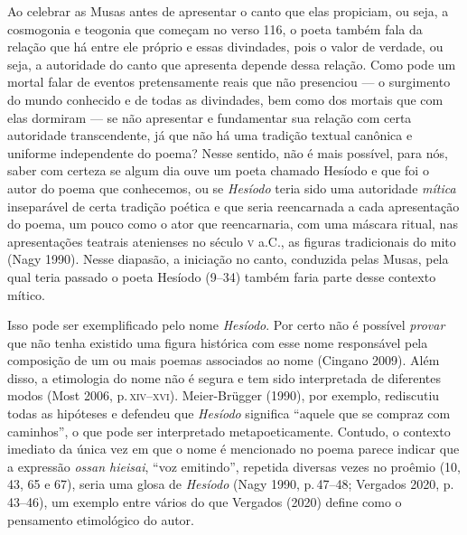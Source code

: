 Ao celebrar as Musas antes de apresentar o canto que elas propiciam, ou
seja, a cosmogonia e teogonia que começam no verso 116, o poeta também
fala da relação que há entre ele próprio e essas divindades, pois o
valor de verdade, ou seja, a autoridade do canto que apresenta depende
dessa relação. Como pode um mortal falar de eventos pretensamente reais
que não presenciou --- o surgimento do mundo conhecido e de todas as
divindades, bem como dos mortais que com elas dormiram --- se não
apresentar e fundamentar sua relação com certa autoridade transcendente,
já que não há uma tradição textual canônica e uniforme independente do
poema? Nesse sentido, não é mais possível, para nós, saber com certeza
se algum dia ouve um poeta chamado Hesíodo e que foi o autor do poema
que conhecemos, ou se \textit{Hesíodo} teria sido uma autoridade
\textit{mítica} inseparável de certa tradição poética e que seria
reencarnada a cada apresentação do poema, um pouco como o ator que
reencarnaria, com uma máscara ritual, nas apresentações teatrais
atenienses no século \textsc{v} a.C., as figuras tradicionais do mito (Nagy
1990). Nesse diapasão, a iniciação no canto, conduzida pelas Musas, pela
qual teria passado o poeta Hesíodo (9--34) também faria parte desse
contexto mítico.

Isso pode ser exemplificado pelo nome \textit{Hesíodo}. Por certo não é
possível \textit{provar} que não tenha existido uma figura histórica com
esse nome responsável pela composição de um ou mais poemas associados ao
nome (Cingano 2009). Além disso, a etimologia do nome não é segura e tem
sido interpretada de diferentes modos (Most 2006, p.\,\textsc{xiv--xvi}).
Meier-Brügger (1990), por exemplo, rediscutiu todas as hipóteses e
defendeu que \textit{Hesíodo} significa ``aquele que se compraz com
caminhos'', o que pode ser interpretado metapoeticamente. Contudo, o
contexto imediato da única vez em que o nome é mencionado no poema
parece indicar que a expressão \textit{ossan hieisai}, ``voz emitindo'',
repetida diversas vezes no proêmio (10, 43, 65 e 67), seria uma glosa de
\textit{Hesíodo} (Nagy 1990, p.\,47--48; Vergados 2020, p.\,43--46), um exemplo
entre vários do que Vergados (2020) define como o pensamento etimológico do autor.

